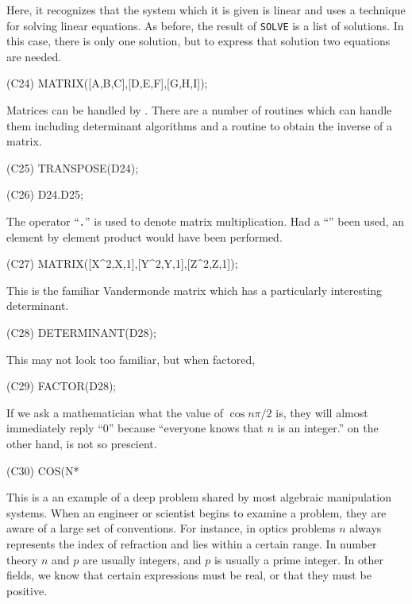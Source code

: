 Here, it recognizes that the system which it is given is linear and
uses a technique for solving linear equations.  As before, the result of 
{\tt SOLVE} is a list of solutions.  In this case, there is only one solution,
but to express that solution two equations are needed.
\begin{code}
(C24) MATRIX([A,B,C],[D,E,F],[G,H,I]);
\end{code}
Matrices can be handled by {\Macsyma}.  There are a number of routines which
can handle them including determinant algorithms and a routine to obtain
the inverse of a matrix.
\begin{code}
(C25) TRANSPOSE(D24);
\end{code}

\begin{code}
(C26) D24.D25;
\end{code}
The operator ``{\tt .}'' is used to denote matrix multiplication.  Had
a ``{\tt *}'' been used, an element by element product would have been 
performed. 

\begin{code}
(C27) MATRIX([X^2,X,1],[Y^2,Y,1],[Z^2,Z,1]);
\end{code}
This is the familiar Vandermonde matrix which has a particularly
interesting determinant.
\begin{code}
(C28) DETERMINANT(D28);
\end{code}
This may not look too familiar, but when factored, 
\begin{code}
(C29) FACTOR(D28);
\end{code}
If we ask a mathematician what the value of $\cos n \pi / 2$ is,
they will almost immediately reply ``0'' because ``everyone knows that
$n$ is an integer.''  {\Macsyma} on the other hand, is not so prescient.  
\begin{code}
(C30) COS(N*%
\end{code}

This is a an example of a deep problem shared by most algebraic
manipulation systems.  When an engineer or scientist begins to examine a
problem, they are aware of a large set of conventions.  For instance, in
optics problems $n$ always represents the index of refraction and lies
within a certain range.  In number theory $n$ and $p$ are usually integers,
and $p$ is usually a prime integer.  In other fields, we know that certain
expressions must be real, or that they must be positive.

